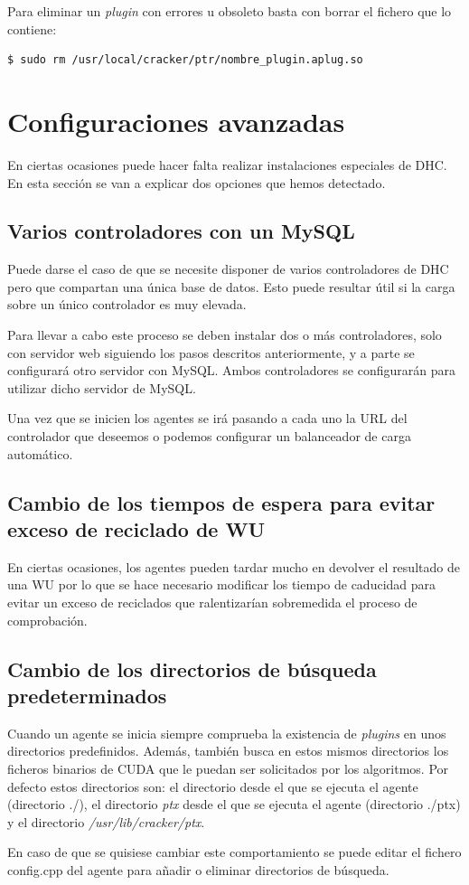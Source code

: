 Para eliminar un \emph{plugin} con errores u obsoleto basta con borrar el fichero que lo contiene:

\begin{verbatim}
$ sudo rm /usr/local/cracker/ptr/nombre_plugin.aplug.so	
\end{verbatim}

\section{Configuraciones avanzadas}\label{sec:conf_avanzada}

En ciertas ocasiones puede hacer falta realizar instalaciones especiales de DHC. En esta sección se van a explicar dos opciones que hemos detectado.

\subsection{Varios controladores con un MySQL}
Puede darse el caso de que se necesite disponer de varios controladores de DHC pero que compartan una única base de datos. Esto puede resultar útil si la carga sobre un único controlador es muy elevada.

Para llevar a cabo este proceso se deben instalar dos o más controladores, solo con servidor web siguiendo los pasos descritos anteriormente, y a parte se configurará otro servidor con MySQL. Ambos controladores se configurarán para utilizar dicho servidor de MySQL.

Una vez que se inicien los agentes se irá pasando a cada uno la URL del controlador que deseemos o podemos configurar un balanceador de carga automático.


\subsection{Cambio de los tiempos de espera para evitar exceso de reciclado de WU}
En ciertas ocasiones, los agentes pueden tardar mucho en devolver el resultado de una WU por lo que se hace necesario modificar los tiempo de caducidad para evitar un exceso de reciclados que ralentizarían sobremedida el proceso de comprobación.

\subsection{Cambio de los directorios de búsqueda predeterminados}
Cuando un agente se inicia siempre comprueba la existencia de \emph{plugins} en unos directorios predefinidos. Además, también busca en estos mismos directorios los ficheros binarios de CUDA que le puedan ser solicitados por los algoritmos. Por defecto estos directorios son: el directorio desde el que se ejecuta el agente (directorio ./), el directorio \emph{ptx} desde el que se ejecuta el agente (directorio ./ptx) y el directorio \emph{/usr/lib/cracker/ptx}.

En caso de que se quisiese cambiar este comportamiento se puede editar el fichero config.cpp del agente para añadir o eliminar directorios de búsqueda.